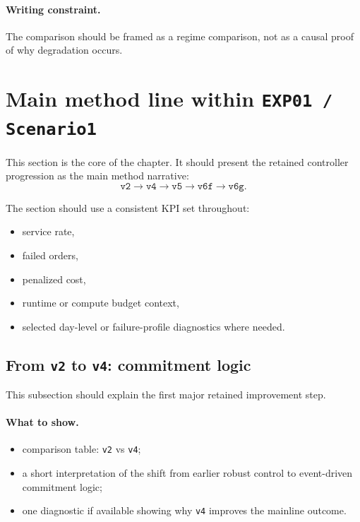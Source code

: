 \paragraph{Writing constraint.}
The comparison should be framed as a regime comparison, not as a causal proof of why degradation occurs.

\section{Main method line within \texttt{EXP01 / Scenario1}}
\label{sec:results-scenario1}

This section is the core of the chapter.
It should present the retained controller progression as the main method narrative:
\[
\texttt{v2} \rightarrow \texttt{v4} \rightarrow \texttt{v5} \rightarrow \texttt{v6f} \rightarrow \texttt{v6g}.
\]

The section should use a consistent KPI set throughout:
\begin{itemize}
    \item service rate,
    \item failed orders,
    \item penalized cost,
    \item runtime or compute budget context,
    \item selected day-level or failure-profile diagnostics where needed.
\end{itemize}

\subsection{From \texttt{v2} to \texttt{v4}: commitment logic}
\label{sec:results-v2-v4}

This subsection should explain the first major retained improvement step.

\paragraph{What to show.}
\begin{itemize}
    \item comparison table: \texttt{v2} vs \texttt{v4};
    \item a short interpretation of the shift from earlier robust control to event-driven commitment logic;
    \item one diagnostic if available showing why \texttt{v4} improves the mainline outcome.
\end{itemize}

